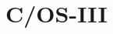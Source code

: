 \chapter{\textmugreek C/OS-III}

\section{}

\section{}

\section{}

\section{}

\section{}

\section{}

\section{}

\section{}


